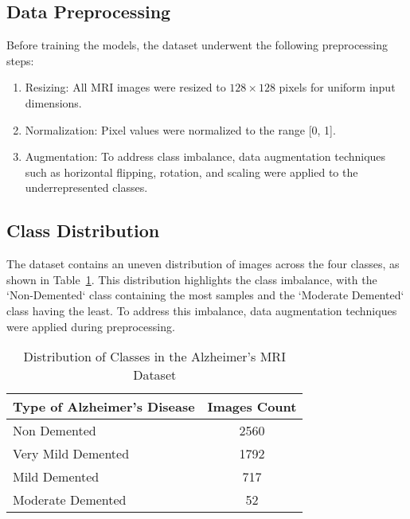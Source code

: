 \documentclass[runningheads]{llncs}
\begin{document}
\subsection{Data Preprocessing}
Before training the models, the dataset underwent the following preprocessing steps:
\begin{enumerate}
    \item Resizing: All MRI images were resized to $128 \times 128$ pixels for uniform input dimensions.
    \item Normalization: Pixel values were normalized to the range [0, 1].
    \item Augmentation: To address class imbalance, data augmentation techniques such as horizontal flipping, rotation, and scaling were applied to the underrepresented classes.
\end{enumerate}

\subsection{Class Distribution}
The dataset contains an uneven distribution of images across the four classes, as shown in Table~\ref{tab:class_distribution}. This distribution highlights the class imbalance, with the `Non-Demented` class containing the most samples and the `Moderate Demented` class having the least. To address this imbalance, data augmentation techniques were applied during preprocessing.

\begin{table}[htbp]
    \centering
    \caption{Distribution of Classes in the Alzheimer's MRI Dataset}
    \label{tab:class_distribution}
    \begin{tabular}{|l|c|}
        \hline
        \textbf{Type of Alzheimer’s Disease} & \textbf{Images Count} \\ \hline
        Non Demented                         & 2560                  \\ \hline
        Very Mild Demented                   & 1792                  \\ \hline
        Mild Demented                        & 717                   \\ \hline
        Moderate Demented                    & 52                    \\ \hline
    \end{tabular}
\end{table}

\sloppy


\end{document}
